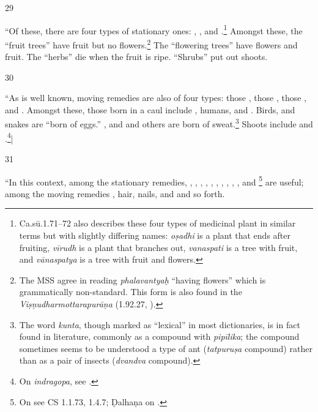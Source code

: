 \begin{translation}
    
    
    \item [29]  
    
“Of these, there are four types of stationary ones:
, ,
 and
.\footnote{Ca.sū.1.71--72 also describes these
    four types of medicinal plant in similar terms but with slightly
    differing names: \emph{oṣadhi} is a plant that ends after
    fruiting, \emph{vīrudh} is a plant that branches out,
    \emph{vanaspati} is a tree with fruit, and \emph{vānaspatya} is a
    tree with fruit and flowers.} Amongst these, the “fruit trees”
    have fruit but no flowers.\footnote{The MSS agree in reading
        \emph{phalavantyaḥ} “having flowers” which is grammatically
        non-standard. This form is also found in the 
        \emph{Viṣṇudharmottarapurāṇa} (1.92.27,
        \cite[1.92.27][56r]{sarm-1912}).}  The “flowering trees” have
        flowers and fruit.  The “herbs” die when the fruit is ripe.
        “Shrubs” put out shoots.
    
    
    
    \item[30]  
    
“As is well known, moving remedies are also of four types: those
, those ,
those , and . Amongst
these, those born in a caul include , humans, and
.  Birds,  and
snakes are “born of eggs.” ,  and  and others are born of
sweat.\footnote{The word \emph{kunta}, though marked as “lexical” in
    most dictionaries, is in fact found in literature, commonly as a
    compound with \emph{pipīlika}; the compound sometimes seems to be
    understood a type of ant (\emph{tatpuruṣa} compound) rather than as a
    pair of insects (\emph{dvandva} compound).}  Shoots include
     and .\footnote{On
        \emph{indragopa}, see \cite{lien-1978}.}|
    
    \item[31] 
    
“In this context, among the stationary remedies, ,
, , ,
, , ,
, , , and
\footnote{On 
    see CS 1.1.73, 1.4.7; Ḍalhaṇa on .} are useful;
    among the moving remedies , hair, nails, and
     and so forth.
    

\end{translation}
